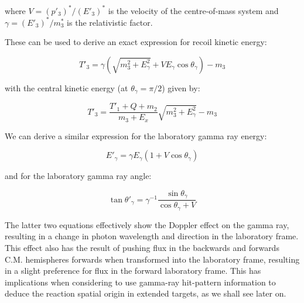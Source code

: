 where $V=(p'_{3})^{*}/(E'_{3})^{*}$ is the velocity of the centre-of-mass system and $\gamma=(E'_{3})^{*}/m^{*}_{3}$ is the relativistic factor. 

These can be used to derive an exact expression for recoil kinetic energy:

\begin{equation}
\label{eqn:recoilenergy}
T'_{3}=\gamma(\sqrt{m_{3}^{2}+E_{\gamma}^{2}}+VE_{\gamma}\cos{\theta_{\gamma}})-m_{3}
\end{equation}

with the central kinetic energy (at $\theta_{\gamma}=\pi/2$) given by:

\begin{equation}
T'_{3}=\frac{T'_{1}+Q+m_{2}}{m_{3}+E_{x}}\sqrt{m_{3}^{2}+E_{\gamma}^{2}}-m_{3}
\end{equation}

We can derive a similar expression for the laboratory gamma ray energy:

\begin{equation}
E'_{\gamma}=\gamma E_{\gamma}(1+V\cos{\theta_{\gamma}})
\end{equation}

and for the laboratory gamma ray angle:

\begin{equation}
\tan{\theta'_{\gamma}}=\gamma^{-1}\frac{\sin{\theta_{\gamma}}}{\cos{\theta_{\gamma}}+V}
\label{eqn:thetagamma}
\end{equation}

The latter two equations effectively show the Doppler effect on the gamma ray, resulting in a change in photon wavelength and direction in the laboratory frame. This effect also has the result of pushing flux in the backwards and forwards C.M. hemispheres forwards when transformed into the laboratory frame, resulting in a slight preference for flux in the forward laboratory frame. This has implications when considering to use gamma-ray hit-pattern information to deduce the reaction spatial origin in extended targets, as we shall see later on.  

